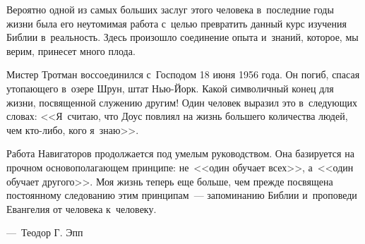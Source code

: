 \documentclass[12pt,article,a4paper,fittopage]{ncc}
\begin{document}
\begin{multicols}{2}
Вероятно одной из самых больших заслуг этого человека в~последние годы жизни была его неутомимая работа с~целью превратить данный курс изучения Библии в~реальность. Здесь произошло соединение опыта и~знаний, которое, мы верим, принесет много плода.

Мистер Тротман воссоединился с~Господом 18 июня 1956 года. Он погиб, спасая утопающего в~озере Шрун, штат Нью-Йорк. Какой символичный конец для жизни, посвященной служению другим! Один человек выразил это в~следующих словах: <<Я~считаю, что Доус повлиял на жизнь большего количества людей, чем кто-либо, кого я~знаю>>.

Работа Навигаторов продолжается под умелым руководством. Она базируется на прочном основополагающем принципе: не~<<один обучает всех>>, а~<<один обучает другого>>.
Моя жизнь теперь еще больше, чем прежде посвящена постоянному следованию этим принципам~--- запоминанию Библии и~проповеди Евангелия от человека к~человеку.
\begin{flushright}
---~Теодор Г. Эпп
\end{flushright}


\end{multicols}
\end{document}
